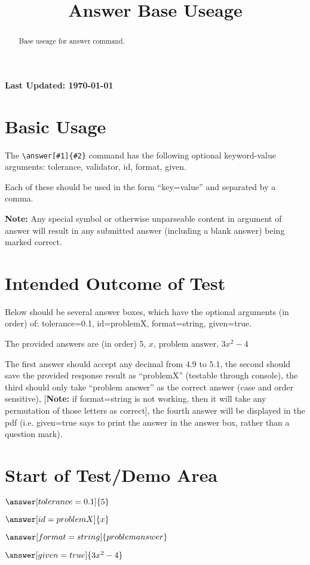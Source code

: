 \documentclass{ximera}
\title{Answer Base Useage}
\begin{document}
\begin{abstract}
    Base useage for answer command.
\end{abstract}
\maketitle

{{\Huge \bfseries Last Updated: \today}} \\


\section{Basic Usage}
The \verb|\answer[#1]{#2}| command has the following optional keyword-value arguments: tolerance, validator, id, format, given.

Each of these should be used in the form ``key=value'' and separated by a comma.

\textbf{Note:} Any special symbol or otherwise unparseable content in argument of answer will result in any submitted answer 
(including a blank answer) being marked correct.

\section{Intended Outcome of Test}
Below should be several answer boxes, which have the optional arguments (in order) of: tolerance=0.1, id=problemX, format=string, given=true.

The provided answers are (in order) $5$, $x$, $\text{problem answer}$, $3x^2 - 4$

The first answer should accept any decimal from $4.9$ to $5.1$, 
the second should save the provided response result as ``problemX'' (testable through console),
the third should only take ``problem answer'' as the correct answer (case and order sensitive), 
[\textbf{Note:} if format=string is not working, then it will take any permutation of those letters as correct],
the fourth answer will be displayed in the pdf (i.e. given=true says to print the answer in the answer box, rather than a question mark).


\section{Start of Test/Demo Area}
\begin{problem}

$\answer[tolerance=0.1]{5}$

$\answer[id=problemX]{x}$

$\answer[format=string]{problem answer}$

$\answer[given=true]{3x^2-4}$

\end{problem}


\hrulefill
\end{document}
